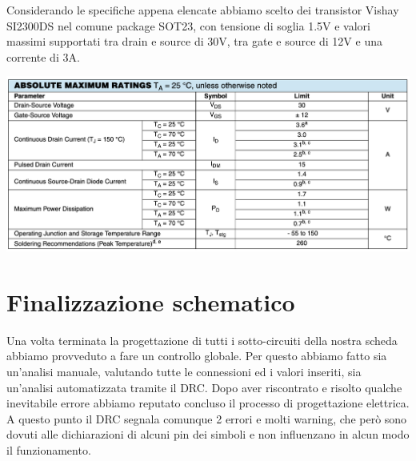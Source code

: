 Considerando le specifiche appena elencate abbiamo scelto dei transistor
Vishay SI2300DS nel comune package SOT23, con tensione di soglia 1.5V e
valori massimi supportati tra drain e source di 30V, tra gate e source
di 12V e una corrente di 3A.

\begin{center}
\includegraphics[scale=0.5]{figures/image69.png}
\captionsetup{type=figure}
\end{center}

\hypertarget{finalizzazione schematico}{%
\section{Finalizzazione schematico}\label{finalizzazione schematico}}

Una volta terminata la progettazione di tutti i sotto-circuiti della 
nostra scheda abbiamo provveduto a fare un controllo globale. Per questo abbiamo fatto 
sia un’analisi manuale, valutando tutte le connessioni ed i valori inseriti, sia un’analisi 
automatizzata tramite il DRC. Dopo aver riscontrato e risolto qualche inevitabile errore 
abbiamo reputato concluso il processo di progettazione elettrica. A questo punto il DRC 
segnala comunque 2 errori e molti warning, che però sono dovuti alle dichiarazioni di alcuni 
pin dei simboli e non influenzano in alcun modo il funzionamento.

